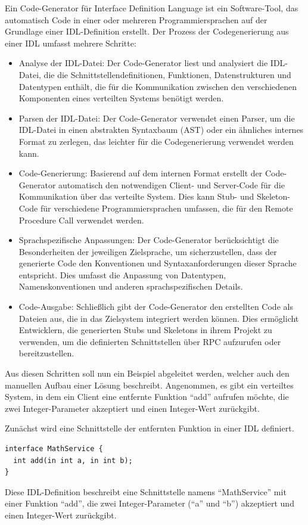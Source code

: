 Ein Code-Generator für Interface Definition Language ist ein Software-Tool, das automatisch Code in einer oder mehreren Programmiersprachen auf der Grundlage einer IDL-Definition erstellt. Der Prozess der Codegenerierung aus einer IDL umfasst mehrere Schritte:
\begin{itemize} 
\item Analyse der IDL-Datei: Der Code-Generator liest und analysiert die IDL-Datei, die die Schnittstellendefinitionen, Funktionen, Datenstrukturen und Datentypen enthält, die für die Kommunikation zwischen den verschiedenen Komponenten eines verteilten Systems benötigt werden.
\item Parsen der IDL-Datei: Der Code-Generator verwendet einen Parser, um die IDL-Datei in einen abstrakten Syntaxbaum (AST) oder ein ähnliches internes Format zu zerlegen, das leichter für die Codegenerierung verwendet werden kann.
\item Code-Generierung: Basierend auf dem internen Format erstellt der Code-Generator automatisch den notwendigen Client- und Server-Code für die Kommunikation über das verteilte System. Dies kann Stub- und Skeleton-Code für verschiedene Programmiersprachen umfassen, die für den Remote Procedure Call verwendet werden.
\item Sprachspezifische Anpassungen: Der Code-Generator berücksichtigt die Besonderheiten der jeweiligen Zielsprache, um sicherzustellen, dass der generierte Code den Konventionen und Syntaxanforderungen dieser Sprache entspricht. Dies umfasst die Anpassung von Datentypen, Namenskonventionen und anderen sprachspezifischen Details.
\item Code-Ausgabe: Schließlich gibt der Code-Generator den erstellten Code als Dateien aus, die in das Zielsystem integriert werden können. Dies ermöglicht Entwicklern, die generierten Stubs und Skeletons in ihrem Projekt zu verwenden, um die definierten Schnittstellen über RPC aufzurufen oder bereitzustellen.
\end{itemize} 

Aus diesen Schritten soll nun ein Beispiel abgeleitet werden, welcher auch den manuellen Aufbau einer Lösung beschreibt. Angenommen, es gibt ein verteiltes System, in dem ein Client eine entfernte Funktion \enquote{add} aufrufen möchte, die zwei Integer-Parameter akzeptiert und einen Integer-Wert zurückgibt.

Zunächst wird eine Schnittstelle der entfernten Funktion in einer IDL definiert. \\
\noindent\begin{minipage}{\textwidth}
\begin{lstlisting}[caption={IDL Example},captionpos=b,label={lst:idl-example}]
interface MathService {
  int add(in int a, in int b);
}
\end{lstlisting}
\end{minipage}
Diese IDL-Definition beschreibt eine Schnittstelle namens \enquote{MathService} mit einer Funktion \enquote{add}, die zwei Integer-Parameter (\enquote{a} und \enquote{b}) akzeptiert und einen Integer-Wert zurückgibt.

